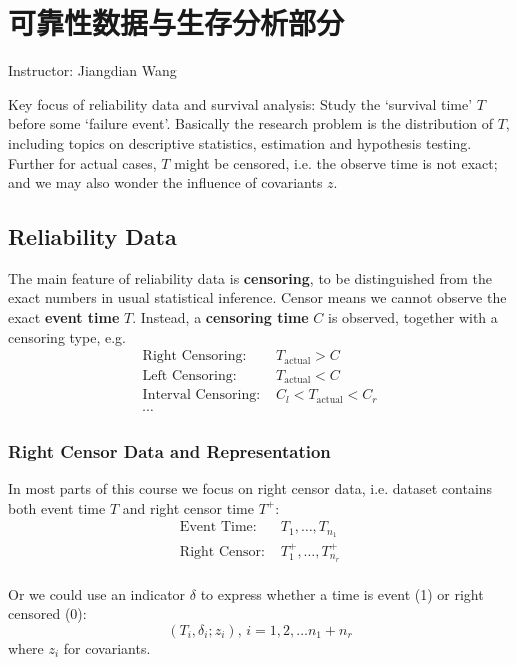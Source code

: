 \chapter{可靠性数据与生存分析部分}\label{SecReliabilityAndSurvivalAnalysis}
\begin{center}
    Instructor: Jiangdian Wang 
\end{center}

Key focus of reliability data and survival analysis: Study the `survival time' $ T $ before some `failure event'. Basically the research problem is the distribution of $ T $, including topics on descriptive statistics, estimation and hypothesis testing. Further for actual cases, $ T $ might be censored, i.e. the observe time is not exact; and we may also wonder the influence of covariants $ z $.

\section{Reliability Data}
The main feature of reliability data is \textbf{censoring}, to be distinguished from the exact numbers in usual statistical inference. Censor means we cannot observe the exact \textbf{event time} $ T $. Instead, a \textbf{censoring time} $ C $ is observed, together with a censoring type, e.g. 
\begin{align}
    \text{Right Censoring: }&T_\mathrm{actual}>C \\
    \text{Left Censoring: }&T_{\mathrm{actual} }<C\\
    \text{Interval Censoring: }&C_l<T_{\mathrm{actual} }<C_r\\
    \cdots&
\end{align} 

\subsection{Right Censor Data and Representation}
In most parts of this course we focus on right censor data, i.e. dataset contains both event time $ T $ and right censor time $ T^+ $:
\begin{align}
    \text{Event Time: }&T_1,\ldots,T_{n_1}\\
    \text{Right Censor: }&T^+_{1},\ldots ,T^+_{n_r}\\
\end{align}

Or we could use an indicator $ \delta  $ to express whether a time is event (1) or right censored (0):
\begin{equation}
    (T_i,\delta _i;z_i),\, i=1,2,\ldots n_1+n_r 
\end{equation}
where $ z_i $ for covariants.

